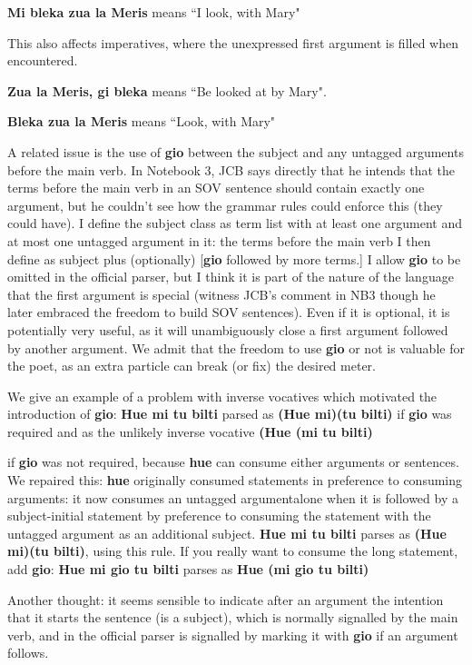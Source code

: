 \documentclass[12pt]{book}
\begin{document}
{{\bf Mi bleka zua la Meris} means ``I look, with Mary"

This also affects imperatives, where the unexpressed first argument is filled when encountered.

{\bf Zua la Meris, gi bleka} means ``Be looked at by Mary".

{\bf Bleka zua la Meris} means ``Look, with Mary"

A related issue is the use of {\bf gio} between the subject and any untagged arguments before the main verb.  In Notebook 3, JCB says directly that he intends that the terms before the main verb in an SOV sentence should contain exactly one argument, but he couldn't see how the grammar rules could enforce this (they could have).  I define the subject class as term list with at least one argument and at most one untagged argument in it:  the terms before the main verb I then define as subject plus (optionally) [{\bf gio} followed by more terms.]   I allow {\bf gio} to be omitted in the official parser, but I think it is part of the nature of the language that the first argument is special (witness JCB's comment in NB3 though he later embraced the freedom to build SOV sentences).  Even if it is optional, it is potentially very useful, as it will unambiguously close a first argument followed by another argument.  We admit that the freedom to use {\bf gio} or not is valuable for the poet, as an extra particle can break (or fix) the desired meter.

We give an example of a problem with inverse vocatives which motivated the introduction of {\bf gio}: {\bf Hue mi tu bilti} parsed as {\bf (Hue mi)(tu bilti)} if {\bf gio} was required and as the unlikely inverse vocative 
\bf (Hue (mi tu bilti)} if {\bf gio} was not required, because {\bf hue} can consume either arguments or sentences.   We repaired this:  {\bf hue} originally consumed statements in preference to consuming arguments:  it now consumes an untagged argumentalone when it is followed by a subject-initial statement by preference to consuming the statement with the untagged argument as an additional subject.   {\bf Hue mi tu bilti} parses as {\bf (Hue mi)(tu bilti)}, using this rule.  If you really want to consume the long statement, add {\bf gio}:  {\bf Hue mi gio tu bilti} parses as  {\bf Hue (mi gio tu bilti)}

Another thought:  it seems sensible to indicate after an argument the intention that it starts the sentence (is a subject), which is normally signalled by the main verb, and in the official parser is signalled by marking it with {\bf gio} if an argument follows.
\end{document}
